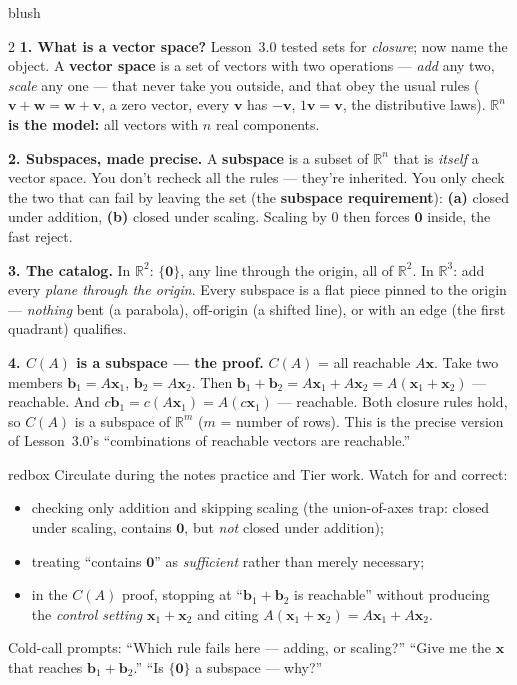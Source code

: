 \documentclass[10pt]{article}
\newcommand{\vv}{\mathbf{v}}
\newcommand{\ww}{\mathbf{w}}
\newcommand{\xx}{\mathbf{x}}
\newcommand{\bb}{\mathbf{b}}
\newcommand{\zero}{\mathbf{0}}
\begin{document}
\begin{skillbox}[Lesson]{blush}
\begin{multicols}{2}
\textbf{1. What is a vector space?} Lesson~3.0 tested sets for \emph{closure}; now name the object.
A \textbf{vector space} is a set of vectors with two operations --- \emph{add} any two, \emph{scale}
any one --- that never take you outside, and that obey the usual rules ($\vv+\ww=\ww+\vv$, a zero
vector, every $\vv$ has $-\vv$, $1\vv=\vv$, the distributive laws). \textbf{$\mathbb{R}^n$ is the
model:} all vectors with $n$ real components.

\textbf{2. Subspaces, made precise.} A \textbf{subspace} is a subset of $\mathbb{R}^n$ that is
\emph{itself} a vector space. You don't recheck all the rules --- they're inherited. You only check
the two that can fail by leaving the set (the \textbf{subspace requirement}): \textbf{(a)} closed
under addition, \textbf{(b)} closed under scaling. Scaling by $0$ then forces $\zero$ inside, the
fast reject.

\columnbreak

\textbf{3. The catalog.} In $\mathbb{R}^2$: $\{\zero\}$, any line through the origin, all of
$\mathbb{R}^2$. In $\mathbb{R}^3$: add every \emph{plane through the origin}. Every subspace is a
flat piece pinned to the origin --- \emph{nothing} bent (a parabola), off-origin (a shifted line),
or with an edge (the first quadrant) qualifies.

\textbf{4. $C(A)$ is a subspace --- the proof.} $C(A)$ = all reachable $A\xx$. Take two members
$\bb_1=A\xx_1$, $\bb_2=A\xx_2$. Then $\bb_1+\bb_2=A\xx_1+A\xx_2=A(\xx_1+\xx_2)$ --- reachable. And
$c\bb_1=c(A\xx_1)=A(c\xx_1)$ --- reachable. Both closure rules hold, so $C(A)$ is a subspace of
$\mathbb{R}^m$ ($m$ = number of rows). This is the precise version of Lesson~3.0's ``combinations of
reachable vectors are reachable.''
\end{multicols}
\end{skillbox}

\begin{skillbox}{redbox}
Circulate during the notes practice and Tier work. Watch for and correct:
\begin{itemize}[leftmargin=1.2em, nosep]
  \item checking only addition and skipping scaling (the union-of-axes trap: closed under scaling,
        contains $\zero$, but \emph{not} closed under addition);
  \item treating ``contains $\zero$'' as \emph{sufficient} rather than merely necessary;
  \item in the $C(A)$ proof, stopping at ``$\bb_1+\bb_2$ is reachable'' without producing the
        \emph{control setting} $\xx_1+\xx_2$ and citing $A(\xx_1+\xx_2)=A\xx_1+A\xx_2$.
\end{itemize}
Cold-call prompts: ``Which rule fails here --- adding, or scaling?'' ``Give me the $\xx$ that reaches
$\bb_1+\bb_2$.'' ``Is $\{\zero\}$ a subspace --- why?''
\end{skillbox}
\end{document}
